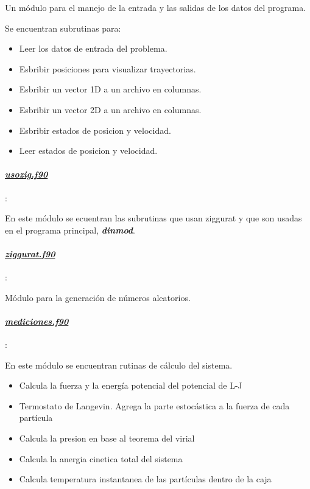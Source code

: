 Un m\'odulo para el manejo de la entrada y las salidas de los datos del programa.

Se encuentran  subrutinas para:
\begin{itemize}
 \item Leer los datos de entrada del problema.

 \item Esbribir posiciones para visualizar trayectorias.

 \item Esbribir un vector 1D a un archivo en columnas.

 \item Esbribir un vector 2D a un archivo en columnas.

 \item Esbribir estados de posicion y velocidad.

 \item Leer estados de posicion y velocidad.

\end{itemize}

\paragraph{\underline{\textit{usozig.f90}}}: 

En este m\'odulo se ecuentran las subrutinas que usan ziggurat y que
son usadas en el programa principal, \textbf{\textit{dinmod}}.
					
\paragraph{\underline{\textit{ziggurat.f90}}}:

Módulo para la generaci\'on de n\'umeros aleatorios. 

\paragraph{\underline{\textit{mediciones.f90}}}:

En este m\'odulo  se encuentran rutinas de c\'alculo del
sistema.

\begin{itemize}
	\item Calcula la fuerza y la energía potencial del potencial de L-J

	\item Termostato de Langevin. Agrega la parte estocástica a la fuerza de cada partícula

	\item Calcula la presion en base al teorema del virial 

	\item Calcula la anergia cinetica total del sistema

	\item Calcula temperatura instantanea de las partículas dentro de la caja 
\end{itemize}


